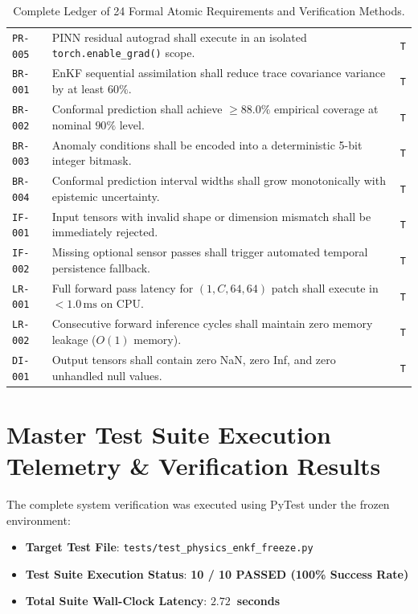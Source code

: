 \documentclass[11pt,a4paper]{article}
\theoremstyle{definition}
\theoremstyle{remark}
\begin{document}
\begin{table}[h!]
\begin{tabular}{lp{8.5cm}c}
\texttt{PR-005} & PINN residual autograd shall execute in an isolated \texttt{torch.enable\_grad()} scope. & \texttt{T} \\
\texttt{BR-001} & EnKF sequential assimilation shall reduce trace covariance variance by at least $60\%$. & \texttt{T} \\
\texttt{BR-002} & Conformal prediction shall achieve $\ge 88.0\%$ empirical coverage at nominal $90\%$ level. & \texttt{T} \\
\texttt{BR-003} & Anomaly conditions shall be encoded into a deterministic 5-bit integer bitmask. & \texttt{T} \\
\texttt{BR-004} & Conformal prediction interval widths shall grow monotonically with epistemic uncertainty. & \texttt{T} \\
\texttt{IF-001} & Input tensors with invalid shape or dimension mismatch shall be immediately rejected. & \texttt{T} \\
\texttt{IF-002} & Missing optional sensor passes shall trigger automated temporal persistence fallback. & \texttt{T} \\
\texttt{LR-001} & Full forward pass latency for $(1, C, 64, 64)$ patch shall execute in $< 1.0\,\text{ms}$ on CPU. & \texttt{T} \\
\texttt{LR-002} & Consecutive forward inference cycles shall maintain zero memory leakage ($O(1)$ memory). & \texttt{T} \\
\texttt{DI-001} & Output tensors shall contain zero NaN, zero Inf, and zero unhandled null values. & \texttt{T} \\
\bottomrule
\end{tabular}
\caption{Complete Ledger of 24 Formal Atomic Requirements and Verification Methods.}
\label{tab:requirements_ledger}
\end{table}

\section{Master Test Suite Execution Telemetry \& Verification Results}

The complete system verification was executed using PyTest under the frozen environment:
\begin{itemize}
    \item \textbf{Target Test File}: \texttt{tests/test\_physics\_enkf\_freeze.py}
    \item \textbf{Test Suite Execution Status}: \textbf{10 / 10 PASSED (100\% Success Rate)}
    \item \textbf{Total Suite Wall-Clock Latency}: \textbf{$2.72$~seconds}
\end{itemize}
\end{document}
